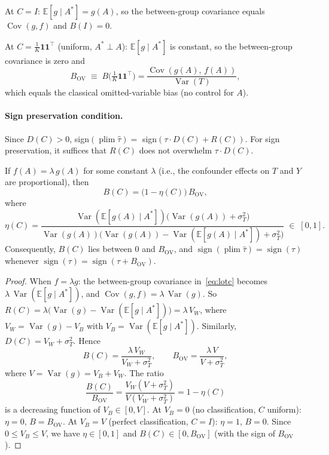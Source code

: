 At $C=I$: $\mathbb{E}[g\mid A^*]=g(A)$, so the between-group covariance equals $\operatorname{Cov}(g,f)$ and $B(I)=0$.

At $C=\frac{1}{K}\mathbf{1}\mathbf{1}^\top$ (uniform, $A^*\perp A$): $\mathbb{E}[g\mid A^*]$ is constant, so the between-group covariance is zero and
\begin{equation}
  B_{\mathrm{OV}} \;\equiv\; B\bigl(\tfrac{1}{K}\mathbf{1}\mathbf{1}^\top\bigr)
  = \frac{\operatorname{Cov}(g(A),\,f(A))}{\operatorname{Var}(T)},
  \label{eq:bov}
\end{equation}
which equals the classical omitted-variable bias (no control for $A$).

\paragraph{Sign preservation condition.}
Since $D(C)>0$, sign$(\operatorname{plim}\hat\tau) = $ sign$(\tau\cdot D(C) + R(C))$.
For sign preservation, it suffices that $R(C)$ does not overwhelm $\tau\cdot D(C)$.

\begin{proposition}
\label{prop:conf_prop}
If $f(A) = \lambda\,g(A)$ for some constant $\lambda$ (i.e., the confounder effects on $T$ and $Y$ are proportional), then
\begin{equation}
  B(C) = \bigl(1-\eta(C)\bigr)\,B_{\mathrm{OV}},
  \label{eq:convex}
\end{equation}
where
\[
  \eta(C) = \frac{\operatorname{Var}(\mathbb{E}[g(A)\mid A^*])\bigl(\operatorname{Var}(g(A))+\sigma_T^2\bigr)}
  {\operatorname{Var}(g(A))\bigl(\operatorname{Var}(g(A))-\operatorname{Var}(\mathbb{E}[g(A)\mid A^*])+\sigma_T^2\bigr)}
  \;\in\;[0,1].
\]
Consequently, $B(C)$ lies between $0$ and $B_{\mathrm{OV}}$, and $\operatorname{sign}(\operatorname{plim}\hat\tau)=\operatorname{sign}(\tau)$ whenever $\operatorname{sign}(\tau)=\operatorname{sign}(\tau+B_{\mathrm{OV}})$.
\end{proposition}

\begin{proof}
When $f=\lambda g$: the between-group covariance in~\eqref{eq:lotc} becomes $\lambda\,\operatorname{Var}(\mathbb{E}[g\mid A^*])$, and $\operatorname{Cov}(g,f)=\lambda\,\operatorname{Var}(g)$.
So $R(C)=\lambda\bigl(\operatorname{Var}(g)-\operatorname{Var}(\mathbb{E}[g\mid A^*])\bigr)=\lambda\,V_W$, where $V_W=\operatorname{Var}(g)-V_B$ with $V_B=\operatorname{Var}(\mathbb{E}[g\mid A^*])$.
Similarly, $D(C)=V_W+\sigma_T^2$.
Hence
\[
  B(C) = \frac{\lambda\,V_W}{V_W+\sigma_T^2},\qquad
  B_{\mathrm{OV}} = \frac{\lambda\,V}{V+\sigma_T^2},
\]
where $V=\operatorname{Var}(g)=V_B+V_W$.
The ratio
\[
  \frac{B(C)}{B_{\mathrm{OV}}} = \frac{V_W(V+\sigma_T^2)}{V(V_W+\sigma_T^2)} = 1 - \eta(C)
\]
is a decreasing function of $V_B\in[0,V]$.
At $V_B=0$ (no classification, $C$ uniform): $\eta=0$, $B=B_{\mathrm{OV}}$.
At $V_B=V$ (perfect classification, $C=I$): $\eta=1$, $B=0$.
Since $0\leq V_B\leq V$, we have $\eta\in[0,1]$ and $B(C)\in[0,B_{\mathrm{OV}}]$ (with the sign of $B_{\mathrm{OV}}$).
\end{proof}

